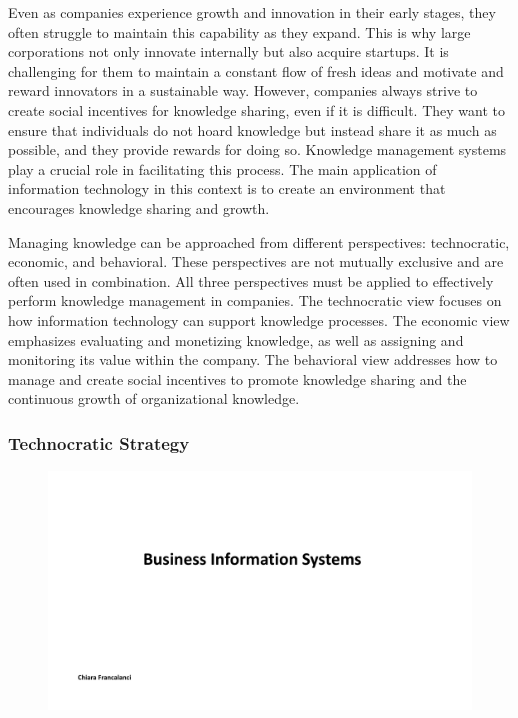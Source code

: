 Even as companies experience growth and innovation in their early
stages, they often struggle to maintain this capability as they expand.
This is why large corporations not only innovate internally but also
acquire startups. It is challenging for them to maintain a constant flow
of fresh ideas and motivate and reward innovators in a sustainable way.
However, companies always strive to create social incentives for
knowledge sharing, even if it is difficult. They want to ensure that
individuals do not hoard knowledge but instead share it as much as
possible, and they provide rewards for doing so. Knowledge management
systems play a crucial role in facilitating this process. The main
application of information technology in this context is to create an
environment that encourages knowledge sharing and growth.

Managing knowledge can be approached from different perspectives:
technocratic, economic, and behavioral. These perspectives are not
mutually exclusive and are often used in combination. All three
perspectives must be applied to effectively perform knowledge management
in companies. The technocratic view focuses on how information
technology can support knowledge processes. The economic view emphasizes
evaluating and monetizing knowledge, as well as assigning and monitoring
its value within the company. The behavioral view addresses how to
manage and create social incentives to promote knowledge sharing and the
continuous growth of organizational knowledge.

\subsubsection{Technocratic Strategy}\label{technocratic-strategy}

\begin{figure}[!h]
    \centering
    \includegraphics[page=10, trim = 1.5cm 6.5cm 1.5cm 3.5cm, clip, width=\textwidth]{images/05 - KM.pdf}
\end{figure}

